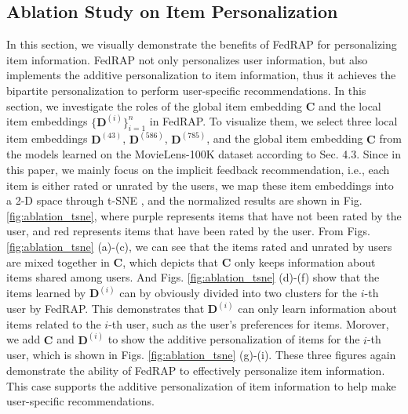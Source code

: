 \documentclass{article} %
\begin{document}
\subsection{Ablation Study on Item Personalization}
In this section, we visually demonstrate the benefits of FedRAP for personalizing item information.
FedRAP not only personalizes user information, but also implements the additive personalization to item information, thus it achieves the bipartite personalization to perform user-specific recommendations. In this section, we investigate the roles of the global item embedding $\mathbf{C}$ and the local item embeddings $\{\mathbf{D}^{(i)}\}^n_{i=1}$ in FedRAP.
To visualize them, we select three local item embeddings $\mathbf{D}^{(43)}$, $\mathbf{D}^{(586)}$, $\mathbf{D}^{(785)}$, and the global item embedding $\mathbf{C}$ from the models learned on the MovieLens-100K dataset according to Sec. 4.3.
Since in this paper, we mainly focus on the implicit feedback recommendation, i.e., each item is either rated or unrated by the users, we map these item embeddings into a 2-D space through t-SNE \citep{van2008visualizing}, and the normalized results are shown in Fig. \ref{fig:ablation_tsne}, where purple represents items that have not been rated by the user, and red represents items that have been rated by the user.
From Figs. \ref{fig:ablation_tsne} (a)-(c), we can see that the items rated and unrated by users are mixed together in $\mathbf{C}$, which depicts that $\mathbf{C}$ only keeps information about items shared among users.
And Figs. \ref{fig:ablation_tsne} (d)-(f) show that the items learned by $\mathbf{D}^{(i)}$ can by obviously divided into two clusters for the $i$-th user by FedRAP. This demonstrates that $\mathbf{D}^{(i)}$ can only learn information about items related to the $i$-th user, such as the user's preferences for items.
Morover, we add $\mathbf{C}$ and $\mathbf{D}^{(i)}$ to show the additive personalization of items for the $i$-th user, which is shown in Figs. \ref{fig:ablation_tsne} (g)-(i). These three figures again demonstrate the ability of FedRAP to effectively personalize item information.
This case supports the additive personalization of item information to help make user-specific recommendations.
\end{document}
